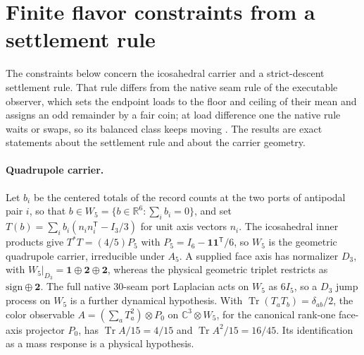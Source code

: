 \documentclass[11pt]{article}
\begin{document}
\appendix
\section{Finite flavor constraints from a settlement rule}
\label{quark-native-response-constraints}

The constraints below concern the icosahedral carrier and a strict-descent
settlement rule. That rule differs from the native seam rule of the
executable observer, which sets the endpoint loads to the floor and ceiling
of their mean and assigns an odd remainder by a fair coin; at load difference
one the native rule waits or swaps, so its balanced class keeps moving
\cite{ophmodel,ophrepairlaw}. The results are exact statements about the
settlement rule and about the carrier geometry.

\paragraph{Quadrupole carrier.}
Let \(b_i\) be the centered totals of the record counts at the two ports of
antipodal pair \(i\), so that
\(b\in W_5=\{b\in\mathbb R^6:\sum_ib_i=0\}\), and set
\(T(b)=\sum_ib_i(n_in_i^{\mathsf T}-I_3/3)\) for unit axis vectors \(n_i\).
The icosahedral inner products give \(T^*T=(4/5)P_5\) with
\(P_5=I_6-\mathbf 1\mathbf 1^{\mathsf T}/6\), so \(W_5\) is the geometric
quadrupole carrier, irreducible under \(A_5\). A supplied face axis has
normalizer \(D_3\), with \(W_5|_{D_3}=\mathbf1\oplus\mathbf2\oplus\mathbf2\),
whereas the physical geometric triplet restricts as
\(\mathrm{sign}\oplus\mathbf2\). The full native 30-seam port Laplacian acts
on \(W_5\) as \(6I_5\), so a \(D_3\) jump process on \(W_5\) is a further
dynamical hypothesis. With
\(\operatorname{Tr}(T_aT_b)=\delta_{ab}/2\), the color observable
\(A=(\sum_aT_a^2)\otimes P_0\) on \(\mathbb C^3\otimes W_5\), for the
canonical rank-one face-axis projector \(P_0\), has
\(\operatorname{Tr}A/15=4/15\) and \(\operatorname{Tr}A^2/15=16/45\). Its
identification as a mass response is a physical hypothesis.
\end{document}
